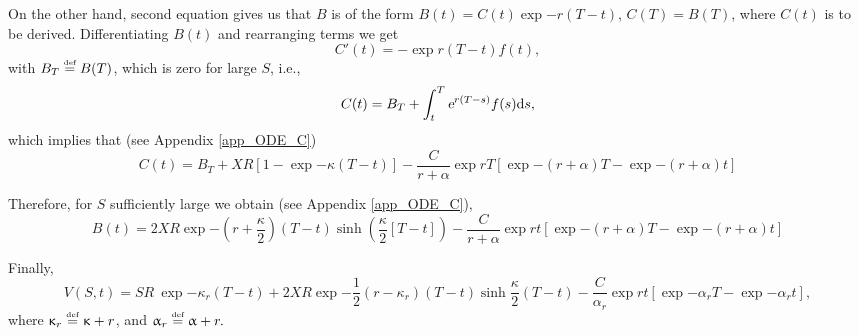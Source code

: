 On the other hand, second equation gives us that $B$ is of the form $B(t) = C(t) \exp{-r (T-t)}$, $C(T) = B(T)$, where $C(t)$ is to be derived. Differentiating $B(t)$ and rearranging terms we get
	\begin{equation}\label{C_ode}
		C'(t) = - \exp{r(T-t)}f(t), 
	\end{equation}
with $  B_T \overset{\text{\tiny def}}{=} B(T) $, which is zero for large $S$, i.e.,
	\begin{equation}\label{C_ode_sol}
		 C(t) 	= B_T + \int_t^T \text{\sl e}^{r(T-s)}f(s)\text{\rm d} s,
	\end{equation}
which implies that (see Appendix \ref{app_ODE_C})
	\begin{equation}
		C(t) = B_T + {X R}  \left[1 -  \exp{-\kappa(T-t)}\right]- \frac{C}{r+\alpha}\exp{rT}\left[\exp{-(r+\alpha)T}-\exp{-(r+\alpha)t}\right]
	\end{equation}

Therefore, for $S$ sufficiently large we obtain (see Appendix \ref{app_ODE_C}),
	\begin{equation}\label{B}
			B(t)  = {2X R}\exp{-\left(r+\frac{\kappa}{2}\right)(T-t)}\sinh\left(\frac{\kappa}{2}[T-t]\right)- \frac{C}{r+\alpha}\exp{rt}\left[\exp{-(r+\alpha)T}-\exp{-(r+\alpha)t}\right]
	\end{equation}

Finally,
	\begin{equation}\label{boundary_formula}
		V(S,t) = SR  \ \exp{-\kappa_r(T-t)} +  {2X R}\exp{-\frac{1}{2}\left(r-\kappa_r\right)(T-t)}\sinh \frac{\kappa}{2}(T-t)- \frac{C}{\alpha_r}\exp{rt}\left[\exp{-\alpha_r T}-\exp{-\alpha_r t}\right],
	\end{equation}
	where $\upkappa_r \overset{\text{\tiny def}}{=} \upkappa + r$, and $\upalpha_r \overset{\text{\tiny def}}{=}  \upalpha + r.$
